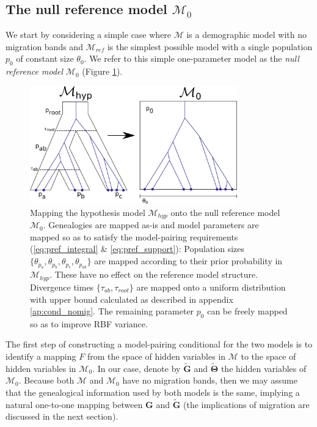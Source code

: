 \documentclass[11pt]{article}
\newcommand{\vect}[1]{\boldsymbol{\mathbf{#1}}}
\newcommand{\M}{\mathcal{M}}
\newcommand{\G}{\vect{G}}
\newcommand{\T}{\vect{\Theta}}
\newcommand{\Mref}{\M_{ref}}
\newcommand{\Gref}{\widetilde{\G}}
\newcommand{\Tref}{\widetilde{\T}}
\newcommand{\1}{\mathbbm{1}}
\begin{document}
\subsection{The null reference model $\M_0$}
\label{The null reference model}
We start by considering a simple case where $\M$ is a demographic model with no migration bands and $\Mref$ is the simplest possible model with a single population $p_0$ of constant size $\theta_0$.
%
We refer to this simple one-parameter model as the {\em null reference model} $\M_0$ (Figure \ref{fig:null_reference_model_no_migration}).
%
\begin{figure}[h]
\centering
\includegraphics[width=0.8\textwidth]
{null_reference_model_no_migration}
\captionsetup{width=.8\textwidth}
\caption{Mapping the hypothesis model $\M_{hyp}$ onto the null reference model $\M_0$. Genealogies are mapped as-is and model parameters are mapped so as to satisfy the model-pairing requirements (\ref{eq:pref_integral} \& \ref{eq:pref_support}):
Population sizes $\{\theta_{p_a}, \theta_{p_b}, \theta_{p_c}, \theta_{p_{ab}}\}$ are mapped according to their prior probability in $\M_{hyp}$. These have no effect on the reference model structure. Divergence times $\{\tau_{ab}, \tau_{root}\}$ are mapped onto a uniform distribution with upper bound calculated as described in appendix \ref{ap:cond_nomig}. The remaining parameter $p_0$ can be freely mapped so as to improve RBF variance.}
\label{fig:null_reference_model_no_migration}
\end{figure}
%
The first step of constructing a model-pairing conditional for the two models is to identify a mapping $F$ from the space
of hidden variables in $\M$ to the space of hidden variables in $\M_0$.
%
In our case, denote by $\Gref$ and $\Tref$ the hidden variables of $\M_0$.
%
Because both $\M$ and $\M_0$ have no migration bands, then we may assume that the genealogical information used
by both models is the same, implying a natural one-to-one mapping between $\G$ and $\Gref$ (the implications of migration are discussed in the next section).
\end{document}
